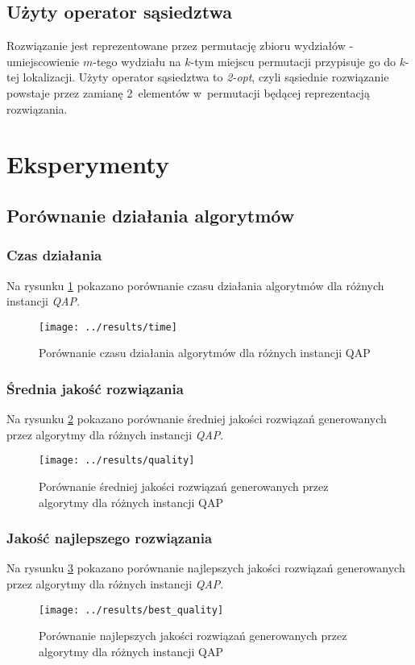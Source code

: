 \documentclass{article}
\begin{document}
	\subsection{Użyty operator sąsiedztwa\label{ss:operator}}
	Rozwiązanie jest reprezentowane przez permutację zbioru wydziałów - umiejscowienie $m$-tego wydziału na $k$-tym miejscu permutacji przypisuje go do $k$-tej lokalizacji.
	Użyty operator sąsiedztwa to \emph{2-opt}, czyli sąsiednie rozwiązanie powstaje przez zamianę 2~elementów w~permutacji będącej reprezentacją rozwiązania.

\section{Eksperymenty}
	\subsection{Porównanie działania algorytmów}
		\subsubsection{Czas działania}Na rysunku \ref{fig:time} pokazano porównanie czasu działania algorytmów dla różnych instancji \emph{QAP}.
			\begin{figure}[h]
				\texttt{[image: ../results/time]}
				\caption{Porównanie czasu działania algorytmów dla różnych instancji QAP\label{fig:time}}
			\end{figure}

		\subsubsection{Średnia jakość rozwiązania}Na rysunku \ref{fig:quality} pokazano porównanie średniej jakości rozwiązań generowanych przez algorytmy dla różnych instancji \emph{QAP}.
			\begin{figure}[h]
				\texttt{[image: ../results/quality]}
				\caption{Porównanie średniej jakości rozwiązań generowanych przez algorytmy dla różnych instancji QAP\label{fig:quality}}
			\end{figure}

		\subsubsection{Jakość najlepszego rozwiązania}Na rysunku \ref{fig:best_quality} pokazano porównanie najlepszych jakości rozwiązań generowanych przez algorytmy dla różnych instancji \emph{QAP}.
		 	\begin{figure}[h]
				\texttt{[image: ../results/best\_quality]}
				\caption{Porównanie najlepszych jakości rozwiązań generowanych przez algorytmy dla różnych instancji QAP\label{fig:best_quality}}
			\end{figure}
\end{document}
